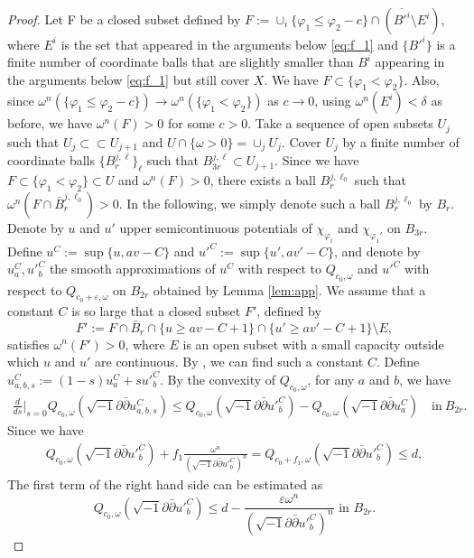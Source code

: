 \documentclass{amsart}
\numberwithin{equation}{section}
\theoremstyle{plain}
\theoremstyle{definition}
\theoremstyle{remark}
\newcommand{\delb}{\sqrt{-1}\partial\bar{\partial}}
\begin{document}
\begin{proof}
    Let F be a closed subset defined by $F:=\cup_i\{\varphi_1\le\varphi_2-c\}\cap (\overline{B'^i}\setminus E^i)$, where $E^i$ is the set that appeared in the arguments below \eqref{eq:f_1} and $\{B'^i\}$ is a finite number of coordinate balls that are slightly smaller than $B^i$ appearing in the arguments below \eqref{eq:f_1} but still cover $X$. We have $F\subset \{\varphi_1<\varphi_2\}$. Also, since $\omega^n(\{\varphi_1\le\varphi_2-c\})\to\omega^n(\{\varphi_1<\varphi_2\})$ as $c\to0$, using $\omega^n(E^i)<\delta$ as before, we have $\omega^n(F)>0$ for some $c>0$.
    Take a sequence of open subsets $U_j$ such that $U_j\subset\subset U_{j+1}$ and $U\cap\{\omega>0\}=\cup_j U_j$. Cover $U_j$ by a finite number of coordinate balls $\{B^{j,\ell}_r\}_\ell$ such that $B^{j,\ell}_{3r}\subset U_{j+1}$. Since we have $F\subset \{\varphi_1<\varphi_2\}\subset U$ and $\omega^n(F)>0$, there exists a ball $B^{j,\ell_0}_{r}$ such that $\omega^n(F\cap \bar{B}^{j,\ell_0}_r)>0$. In the following, we simply denote such a ball $B^{j,\ell_0}_r$ by $B_r$.
    Denote by $u$ and $u'$ upper semicontinuous potentials of $\chi_{\varphi_i}$ and $\chi_{\varphi_1'}$ on $B_{3r}$. Define $u^C:=\sup\{u,av-C\}$ and $u'^C:=\sup\{u',av'-C\}$, and denote by $u^C_a, u'^C_b$ the smooth approximations of $u^C$ with respect to $Q_{c_0,\omega}$ and $u'^C$ with respect to $Q_{c_0+\varepsilon,\omega}$ on $B_{2r}$ obtained by Lemma \ref{lem:app}. 
    We assume that a constant $C$ is so large that a closed subset $F'$, defined by $$F':=F\cap \bar{B}_r\cap\{u\ge av-C+1\}\cap\{u'\ge av'-C+1\}\setminus E,$$ satisfies $\omega^n(F')>0$, where $E$ is an open subset with a small capacity outside which $u$ and $u'$ are continuous. By \cite[Theorem 6.10]{BT}, we can find such a constant $C$.
    Define $u^C_{a,b,s}:=(1-s)u^C_a+s u'^C_b$. By the convexity of $Q_{c_0,\omega}$, for any $a$ and $b$, we have
    \begin{align*}
        \frac{d}{ds}\Bigg\vert_{s=0} Q_{c_0,\omega}(\delb u_{a,b,s}^C)\le Q_{c_0,\omega}(\delb u'^C_b)-Q_{c_0,\omega}(\delb u^C_a) \quad \text{in}\  B_{2r}.
    \end{align*}
    Since we have
    \begin{align*}
        Q_{c_0,\omega}(\delb u'^C_b)+f_1\frac{\omega^n}{(\delb u'^C_b)^n}=Q_{c_0+f_1,\omega}(\delb u'^C_b)\le d,
    \end{align*}
    The first term of the right hand side can be estimated as
    \begin{equation*}
        Q_{c_0,\omega}(\delb u'^C_b)\le d-\frac{\varepsilon\omega^n}{\left(\delb u'^C_b\right)^n} \text{ in } B_{2r}.

\end{equation*}
\end{proof}
\end{document}
